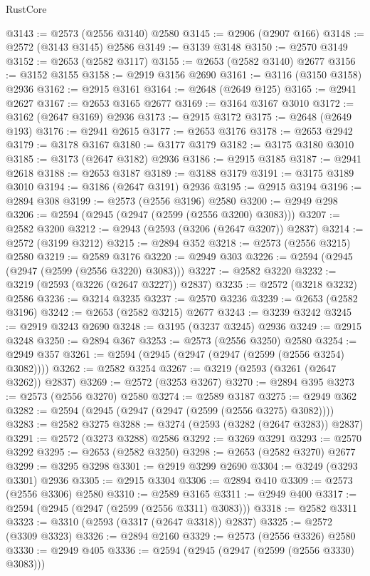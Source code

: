 \begin{lexlean}{RustCore}
\begin{coremodule}
@3143 := @2573 (@2556 @3140) @2580
@3145 := @2906 (@2907 @166)
@3148 := @2572 (@3143 @3145) @2586
@3149 := @3139 @3148
@3150 := @2570 @3149
@3152 := @2653 (@2582 @3117)
@3155 := @2653 (@2582 @3140) @2677
@3156 := @3152 @3155
@3158 := @2919 @3156 @2690
@3161 := @3116 (@3150 @3158) @2936
@3162 := @2915 @3161
@3164 := @2648 (@2649 @125)
@3165 := @2941 @2627
@3167 := @2653 @3165 @2677
@3169 := @3164 @3167 @3010
@3172 := @3162 (@2647 @3169) @2936
@3173 := @2915 @3172
@3175 := @2648 (@2649 @193)
@3176 := @2941 @2615
@3177 := @2653 @3176
@3178 := @2653 @2942
@3179 := @3178 @3167
@3180 := @3177 @3179
@3182 := @3175 @3180 @3010
@3185 := @3173 (@2647 @3182) @2936
@3186 := @2915 @3185
@3187 := @2941 @2618
@3188 := @2653 @3187
@3189 := @3188 @3179
@3191 := @3175 @3189 @3010
@3194 := @3186 (@2647 @3191) @2936
@3195 := @2915 @3194
@3196 := @2894 @308
@3199 := @2573 (@2556 @3196) @2580
@3200 := @2949 @298
@3206 := @2594 (@2945 (@2947 (@2599 (@2556 @3200) @3083)))
@3207 := @2582 @3200
@3212 := @2943 (@2593 (@3206 (@2647 @3207)) @2837)
@3214 := @2572 (@3199 @3212)
@3215 := @2894 @352
@3218 := @2573 (@2556 @3215) @2580
@3219 := @2589 @3176
@3220 := @2949 @303
@3226 := @2594 (@2945 (@2947 (@2599 (@2556 @3220) @3083)))
@3227 := @2582 @3220
@3232 := @3219 (@2593 (@3226 (@2647 @3227)) @2837)
@3235 := @2572 (@3218 @3232) @2586
@3236 := @3214 @3235
@3237 := @2570 @3236
@3239 := @2653 (@2582 @3196)
@3242 := @2653 (@2582 @3215) @2677
@3243 := @3239 @3242
@3245 := @2919 @3243 @2690
@3248 := @3195 (@3237 @3245) @2936
@3249 := @2915 @3248
@3250 := @2894 @367
@3253 := @2573 (@2556 @3250) @2580
@3254 := @2949 @357
@3261 := @2594 (@2945 (@2947 (@2947 (@2599 (@2556 @3254) @3082))))
@3262 := @2582 @3254
@3267 := @3219 (@2593 (@3261 (@2647 @3262)) @2837)
@3269 := @2572 (@3253 @3267)
@3270 := @2894 @395
@3273 := @2573 (@2556 @3270) @2580
@3274 := @2589 @3187
@3275 := @2949 @362
@3282 := @2594 (@2945 (@2947 (@2947 (@2599 (@2556 @3275) @3082))))
@3283 := @2582 @3275
@3288 := @3274 (@2593 (@3282 (@2647 @3283)) @2837)
@3291 := @2572 (@3273 @3288) @2586
@3292 := @3269 @3291
@3293 := @2570 @3292
@3295 := @2653 (@2582 @3250)
@3298 := @2653 (@2582 @3270) @2677
@3299 := @3295 @3298
@3301 := @2919 @3299 @2690
@3304 := @3249 (@3293 @3301) @2936
@3305 := @2915 @3304
@3306 := @2894 @410
@3309 := @2573 (@2556 @3306) @2580
@3310 := @2589 @3165
@3311 := @2949 @400
@3317 := @2594 (@2945 (@2947 (@2599 (@2556 @3311) @3083)))
@3318 := @2582 @3311
@3323 := @3310 (@2593 (@3317 (@2647 @3318)) @2837)
@3325 := @2572 (@3309 @3323)
@3326 := @2894 @2160
@3329 := @2573 (@2556 @3326) @2580
@3330 := @2949 @405
@3336 := @2594 (@2945 (@2947 (@2599 (@2556 @3330) @3083)))

\end{coremodule}
\end{lexlean}
